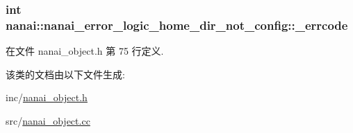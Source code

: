 \subsubsection[{\+\_\+errcode}]{\setlength{\rightskip}{0pt plus 5cm}int nanai\+::nanai\+\_\+error\+\_\+logic\+\_\+home\+\_\+dir\+\_\+not\+\_\+config\+::\+\_\+errcode}\label{classnanai_1_1nanai__error__logic__home__dir__not__config_a9bda795d3a757430411d101bbf9a2df4}


在文件 nanai\+\_\+object.\+h 第 75 行定义.



该类的文档由以下文件生成\+:\begin{DoxyCompactItemize}
\item 
inc/\hyperlink{nanai__object_8h}{nanai\+\_\+object.\+h}\item 
src/\hyperlink{nanai__object_8cc}{nanai\+\_\+object.\+cc}\end{DoxyCompactItemize}
